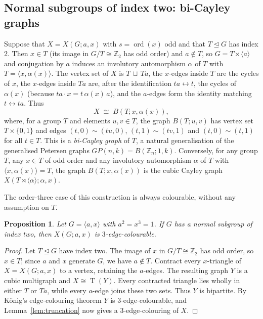 \documentclass[11pt,a4paper]{article}
\newtheorem{proposition}[theorem]{Proposition}
\theoremstyle{definition}
\theoremstyle{remark}
\newcommand{\ord}{\operatorname{ord}}
\newcommand{\ZZ}{\mathbb{Z}}
\newcommand{\X}[3]{X(#1;#2,#3)}
\newcommand{\Tr}{\operatorname{T}}
\begin{document}
\subsection{Normal subgroups of index two: bi-Cayley graphs}\label{sec:bicayley}
Suppose that $X=\X{G}{a}{x}$ with $s=\ord(x)$ odd and that $T\trianglelefteq G$ has index $2$.  Then $x\in T$ (its image in $G/T\cong\ZZ_2$ has odd order) and $a\notin T$, so $G=T\rtimes\langle a\rangle$ and conjugation by $a$ induces an involutory automorphism $\alpha$ of $T$ with $T=\langle x,\alpha(x)\rangle$.  The vertex set of $X$ is $T\,\sqcup\,Ta$, the $x$-edges inside $T$ are the cycles of $x$, the $x$-edges inside $Ta$ are, after the identification $ta\leftrightarrow t$, the cycles of $\alpha(x)$ (because $ta\cdot x=t\,\alpha(x)\,a$), and the $a$-edges form the identity matching $t\leftrightarrow ta$.  Thus
\begin{equation}\label{eq:bicayley}
X\;\cong\; B(T;x,\alpha(x)),
\end{equation}
where, for a group $T$ and elements $u,v\in T$, the graph $B(T;u,v)$ has vertex set $T\times\{0,1\}$ and edges $(t,0)\sim(tu,0)$, $(t,1)\sim(tv,1)$ and $(t,0)\sim(t,1)$ for all $t\in T$.
This is a \emph{bi-Cayley graph} of $T$, a natural generalisation of the generalised Petersen graphs $GP(n,k)=B(\ZZ_n;1,k)$.  Conversely, for any group $T$, any $x\in T$ of odd order and any involutory automorphism $\alpha$ of $T$ with $\langle x,\alpha(x)\rangle=T$, the graph $B(T;x,\alpha(x))$ is the cubic Cayley graph $\X{T\rtimes\langle\alpha\rangle}{\alpha}{x}$.

The order-three case of this construction is always colourable, without any assumption on $T$.

\begin{proposition}\label{prop:index2-three}
Let $G=\langle a,x\rangle$ with $a^2=x^3=1$.  If $G$ has a normal subgroup of index two, then $\X{G}{a}{x}$ is $3$-edge-colourable.
\end{proposition}
\begin{proof}
Let $T\trianglelefteq G$ have index two.  The image of $x$ in $G/T\cong\ZZ_2$ has odd order, so $x\in T$; since $a$ and $x$ generate $G$, we have $a\notin T$.  Contract every $x$-triangle of $X=\X{G}{a}{x}$ to a vertex, retaining the $a$-edges.  The resulting graph $Y$ is a cubic multigraph and $X\cong\Tr(Y)$.  Every contracted triangle lies wholly in either $T$ or $Ta$, while every $a$-edge joins these two sets.  Thus $Y$ is bipartite.  By K\H{o}nig's edge-colouring theorem $Y$ is $3$-edge-colourable, and Lemma~\ref{lem:truncation} now gives a $3$-edge-colouring of $X$.
\end{proof}
\end{document}
